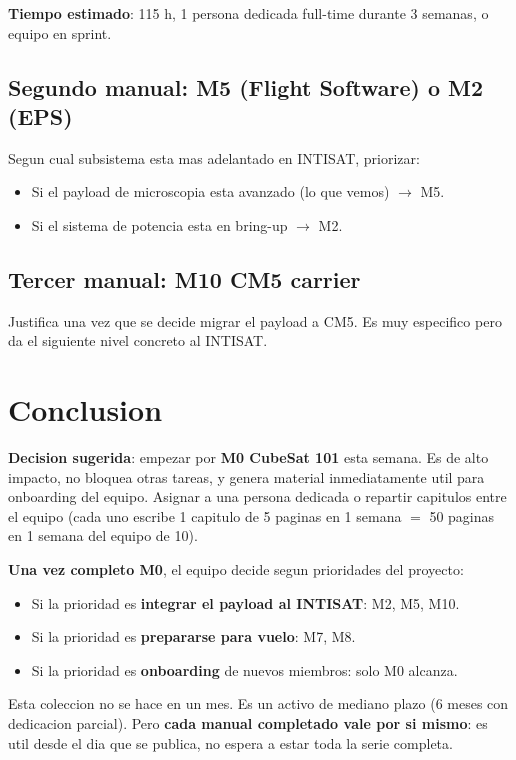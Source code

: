 \documentclass[11pt,a4paper,oneside]{report}
\begin{document}
\textbf{Tiempo estimado}: 115 h, 1 persona dedicada full-time durante 3
semanas, o equipo en sprint.

\section{Segundo manual: M5 (Flight Software) o M2 (EPS)}

Segun cual subsistema esta mas adelantado en INTISAT, priorizar:

\begin{itemize}[leftmargin=2em]
  \item Si el payload de microscopia esta avanzado (lo que vemos) $\to$ M5.
  \item Si el sistema de potencia esta en bring-up $\to$ M2.
\end{itemize}

\section{Tercer manual: M10 CM5 carrier}

Justifica una vez que se decide migrar el payload a CM5. Es muy especifico
pero da el siguiente nivel concreto al INTISAT.

\chapter{Conclusion}

\begin{tip}
\textbf{Decision sugerida}: empezar por \textbf{M0 CubeSat 101} esta
semana. Es de alto impacto, no bloquea otras tareas, y genera material
inmediatamente util para onboarding del equipo. Asignar a una persona
dedicada o repartir capitulos entre el equipo (cada uno escribe 1
capitulo de 5 paginas en 1 semana $=$ 50 paginas en 1 semana del equipo
de 10).
\end{tip}

\textbf{Una vez completo M0}, el equipo decide segun prioridades del
proyecto:
\begin{itemize}[leftmargin=2em]
  \item Si la prioridad es \textbf{integrar el payload al INTISAT}: M2, M5, M10.
  \item Si la prioridad es \textbf{prepararse para vuelo}: M7, M8.
  \item Si la prioridad es \textbf{onboarding} de nuevos miembros: solo M0
        alcanza.
\end{itemize}

Esta coleccion no se hace en un mes. Es un activo de mediano plazo
(6 meses con dedicacion parcial). Pero \textbf{cada manual completado vale
por si mismo}: es util desde el dia que se publica, no espera a estar
toda la serie completa.
\end{document}
